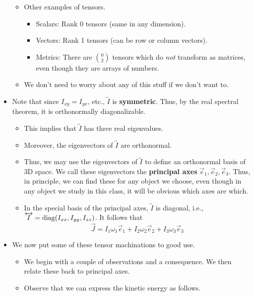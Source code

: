 \documentclass[../notes.tex]{subfiles}
\begin{document}
\begin{itemize}
\begin{itemize}
        \item Other examples of tensors.
        \begin{itemize}
            \item Scalars: Rank 0 tensors (same in any dimension).
            \item Vectors: Rank 1 tensors (can be row or column vectors).
            \item Metrics: There are $\binom{0}{2}$ tensors which do \emph{not} transform as matrices, even though they are arrays of numbers.
        \end{itemize}
        \item We don't need to worry about any of this stuff if we don't want to.
    \end{itemize}
    \item Note that since $I_{xy}=I_{yx}$, etc., $\overleftrightarrow{I}$ is \textbf{symmetric}. Thus, by the real spectral theorem, it is orthonormally diagonalizable.
    \begin{itemize}
        \item This implies that $\overleftrightarrow{I}$ has three real eigenvalues.
        \item Moreover, the eigenvectors of $\overleftrightarrow{I}$ are orthonormal.
        \item Thus, we may use the eigenvectors of $\overleftrightarrow{I}$ to define an orthonormal basis of 3D space. We call these eigenvectors the \textbf{principal axes} $\vec{e}_1,\vec{e}_2,\vec{e}_3$. Thus, in principle, we can find these for any object we choose, even though in any object we study in this class, it will be obvious which axes are which.
        \item In the special basis of the principal axes, $\overleftrightarrow{I}$ is diagonal, i.e., $\overleftrightarrow{I}=\operatorname{diag}(I_{xx},I_{yy},I_{zz})$. It follows that
        \begin{equation*}
            \vec{J} = I_1\omega_1\vec{e}_1+I_2\omega_2\vec{e}_2+I_3\omega_3\vec{e}_3
        \end{equation*}
    \end{itemize}
    \item We now put some of these tensor machinations to good use.
    \begin{itemize}
        \item We begin with a couple of observations and a consequence. We then relate these back to principal axes.
        \item Observe that we can express the kinetic energy as follows.

\end{itemize}
\end{itemize}
\end{document}
